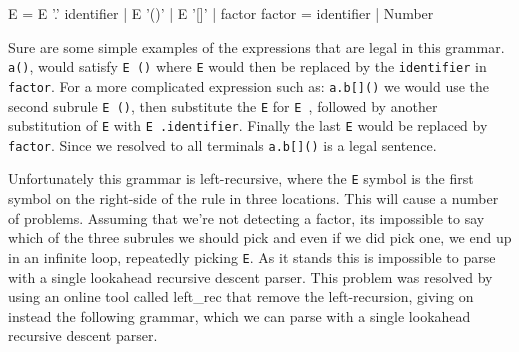 

\begin{lcverbatim}
E       = E '.' identifier
        | E '()'
        | E '[]'
        | factor
factor  = identifier
        | Number
\end{lcverbatim}

Sure are some simple examples of the expressions that are legal in this grammar. {\tt a()}, would satisfy {\tt E \textquotesingle()\textquotesingle} where {\tt E} would then be replaced by the {\tt identifier} in {\tt factor}. For a more complicated expression such as: {\tt a.b[]()} we would use the second subrule {\tt E \textquotesingle()\textquotesingle}, then substitute the {\tt E} for {\tt E \textquotesingle[]\textquotesingle}, followed by another substitution of {\tt E} with {\tt E \textquotesingle.\textquotesingle identifier}. Finally the last {\tt E} would be replaced by {\tt factor}. Since we resolved to all terminals {\tt a.b[]()} is a legal sentence.

Unfortunately this grammar is left-recursive, where the {\tt E} symbol is the first symbol on the right-side of the rule in three locations. This will cause a number of problems. Assuming that we're not detecting a factor, its impossible to say which of the three subrules we should pick and even if we did pick one, we end up in an infinite loop, repeatedly picking {\tt E}. As it stands this is impossible to parse with a single lookahead recursive descent parser. This problem was resolved by using an online tool called left_rec that remove the left-recursion, giving on instead the following grammar, which we can parse with a single lookahead recursive descent parser.

